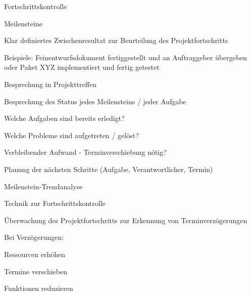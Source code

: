 \documentclass[a4paper]{article}
\begin{document}
\begin{multicols}{3}
  Fortschrittskontrolle
  \begin{itemize*}
    \item Meilensteine
          \begin{itemize*}
            \item Klar definiertes Zwischenresultat zur Beurteilung des Projektfortschritts
            \item Beispiele: Feinentwurfsdokument fertiggestellt und an Auftraggeber übergeben oder Paket XYZ implementiert und fertig getestet
          \end{itemize*}
    \item Besprechung in Projekttreffen
          \begin{itemize*}
            \item Besprechung des Status jedes Meilensteins / jeder Aufgabe
            \item Welche Aufgaben sind bereits erledigt?
            \item Welche Probleme sind aufgetreten / gelöst?
            \item Verbleibender Aufwand - Terminverschiebung nötig?
            \item Planung der nächsten Schritte (Aufgabe, Verantwortlicher, Termin)
          \end{itemize*}
  \end{itemize*}

  Meilenstein-Trendanalyse
  \begin{itemize*}
    \item Technik zur Fortschrittskontrolle
    \item Überwachung des Projektfortschritts zur Erkennung von Terminverzögerungen
    \item Bei Verzögerungen:
          \begin{itemize*}
            \item Ressourcen erhöhen
            \item Termine verschieben
            \item Funktionen reduzieren
          \end{itemize*}
  \end{itemize*}


\end{multicols}
\end{document}
